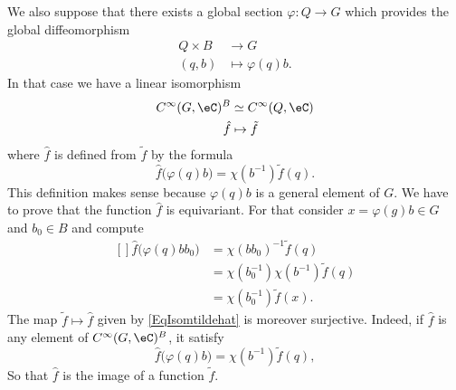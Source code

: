 We also suppose that there exists a global section $\varphi\colon Q\to G$ which provides the global diffeomorphism
\begin{equation}
	\begin{aligned}
		Q\times B & \to G                \\
		(q,b)     & \mapsto \varphi(q)b.
	\end{aligned}
\end{equation}
In that case we have a linear isomorphism
\begin{equation}		\label{EqIsomTildeHat}
	\begin{aligned}
		C^{\infty}(G,\eC)^B & \simeq  C^{\infty}(Q,\eC) \\
		\hat f              & \mapsto \tilde f
	\end{aligned}
\end{equation}
where $\hat f$ is defined from $\tilde f$ by the formula
\begin{equation}		\label{EqIsomtildehat}
	\hat f\big( \varphi(q)b \big)=\chi(b^{-1})\tilde f(q).
\end{equation}
This definition makes sense because $\varphi(q)b$ is a general element of $G$. We have to prove that the function $\hat f$ is equivariant. For that consider $x=\varphi(g)b\in G$ and $b_0\in B$ and compute
\begin{equation}
	\begin{aligned}[]
		\hat f\big( \varphi(q)bb_0 \big) & =\chi(bb_0)^{-1}\tilde f(q)            \\
		                                 & =\chi(b_0^{-1})\chi(b^{-1})\tilde f(q) \\
		                                 & =\chi(b_0^{-1})\tilde f(x).
	\end{aligned}
\end{equation}
The map $\tilde f\mapsto\hat f$ given by \eqref{EqIsomtildehat} is moreover surjective. Indeed, if $\hat f$ is any element of $ C^{\infty}(G,\eC)^B$, it satisfy
\begin{equation}
	\hat f\big( \varphi(q)b \big)=\chi(b^{-1})\tilde f(q),
\end{equation}
So that $\hat f$ is the image of a function $\tilde f$.

